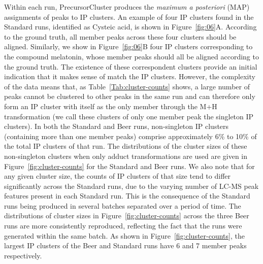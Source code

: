 Within each run, PrecursorCluster produces the \textit{maximum a posteriori} (MAP) assignments of peaks to IP clusters. An example of four IP clusters found in the Standard runs, identified as Cysteic acid, is shown in Figure~\ref{fig:06}A. According to the ground truth, all member peaks across these four clusters should be aligned. Similarly, we show in Figure~\ref{fig:06}B four IP clusters corresponding to the compound melatonin, whose member peaks should all be aligned according to the ground truth. The existence of these correspondent clusters provide an initial indication that it makes sense of match the IP clusters. However, the complexity of the data means that, as Table~\ref{Tab:cluster-counts} shows, a large number of peaks cannot be clustered to other peaks in the same run and can therefore only form an IP cluster with itself as the only member through the M+H transformation (we call these clusters of only one member peak the singleton IP clusters). In both the Standard and Beer runs, non-singleton IP clusters (containing more than one member peaks) comprise approximately 6\% to 10\% of the total IP clusters of that run. The distributions of the cluster sizes of these non-singleton clusters when only adduct transformations are used are given in Figure~\ref{fig:cluster-counts} for the Standard and Beer runs. We also note that for any given cluster size, the counts of IP clusters of that size tend to differ significantly across the Standard runs, due to the varying number of LC-MS peak features present in each Standard run. This is the consequence of the Standard runs being produced in several batches separated over a period of time. The distributions of cluster sizes in Figure~\ref{fig:cluster-counts} across the three Beer runs are more consistently reproduced, reflecting the fact that the runs were generated within the same batch. As shown in Figure~\ref{fig:cluster-counts}, the largest IP clusters of the Beer and Standard runs have 6 and 7 member peaks respectively. 

